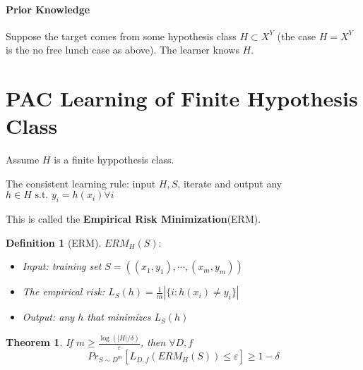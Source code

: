 \documentclass{book}
\newcommand{\st}{\text{ s.t. }}
\newtheorem{Thm}{Theorem}[section]
\newtheorem{Def}{Definition}[section]
\begin{document}
\paragraph{Prior Knowledge} Suppose the target comes from some hypothesis class $H\subset X^{Y}$ (the case $H=X^{Y}$ is the no free lunch case as above). The learner knows $H$.

\section{PAC Learning of Finite Hypothesis Class}
Assume $H$ is a finite hyppothesis class.

The consistent learning rule: input $H,S$, iterate and output any $h\in H\st y_{i}=h(x_{i})\forall i$

This is called the \textbf{Empirical Risk Minimization}(ERM).
\begin{Def}[ERM]
  $ERM_{H}(S):$
  \begin{itemize}
  \item Input: training set $S=((x_{1},y_{1}),\cdots, (x_{m},y_{m}))$
  \item The empirical risk: $L_{S}(h)=\frac{1}{m}|\{i:h(x_{i})\neq y_{i}\}|$
  \item Output: any $h$ that minimizes $L_{S}(h)$
  \end{itemize}
\end{Def}


\begin{Thm}
  If $m\geq \frac{\log(|H|/\delta)}{\varepsilon}$, then $\forall D,f$
  \[Pr_{S\sim D^{m}}[L_{D,f}(ERM_{H}(S))\leq\varepsilon]\geq 1-\delta\]
\end{Thm}
\end{document}
